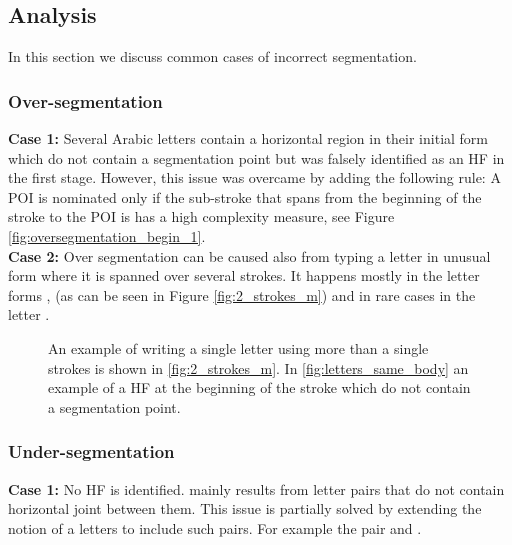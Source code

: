 \documentclass[journal,compsoc]{IEEEtran}
\begin{document}
\subsection{Analysis}
In this section we discuss common cases of incorrect segmentation.
\subsubsection{Over-segmentation}
\textbf{Case 1:} Several Arabic letters contain a horizontal region in their initial form which do not contain a segmentation point but was falsely identified as an HF in the first stage. However, this issue was overcame by adding the following rule: A POI is nominated only if the sub-stroke that spans from the beginning of the stroke to the POI is has a high complexity measure, see Figure \ref{fig:oversegmentation_begin_1}.\\

\textbf{Case 2:} Over segmentation can be caused also from typing a letter in unusual form where it is spanned over several strokes. It happens mostly in the letter forms ,  (as can be seen in Figure \ref{fig:2_strokes_m}) and in rare cases in the letter .

\begin{figure}
\centering
        \qquad
        \qquad
    \caption{An example of writing a single letter using more than a single strokes is shown in \ref{fig:2_strokes_m}. In \ref{fig:letters_same_body} an example of a HF at the beginning of the stroke which do not contain a segmentation point.}
   \label{fig:over_segmentations}
\end{figure}

\subsubsection{Under-segmentation}
\textbf{Case 1:} No HF is identified. mainly results from letter pairs that do not contain horizontal joint between them. This issue is partially solved by extending the notion of a letters to include such pairs. For example the pair  and .\\
\end{document}
